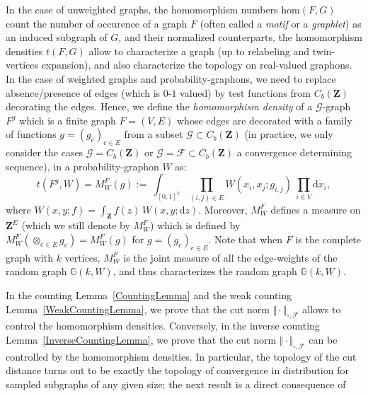 \documentclass{amsart}
\theoremstyle{plain}
\theoremstyle{definition}
\newcommand{\Space}{\mathbf{Z}}
\newcommand{\cG}{\mathcal{G}}
\newcommand{\bbG}{\mathbb{G}}
\newcommand{\CbFunct}{C_b(\Space)}
\newcommand{\NcutFSymbol}{\Vert\cdot\Vert_{\square,\mathcal{F}}}
\newcommand{\F}{\mathcal{F}}
\newcommand{\drv}{\mathrm{d}}
\begin{document}
In   the   case  of   unweighted   graphs,   the  homomorphism   numbers
$\text{hom}(F,G)$ count  the number of  occurence of a graph  $F$ (often
called a  \emph{motif} or a  \emph{graphlet}) as an induced  subgraph of
$G$,  and  their  normalized counterparts,  the  homomorphism  densities
$t(F,G)$  allow   to  characterize  a   graph  (up  to   relabeling  and
twin-vertices  expansion),   and  also  characterize  the   topology  on
real-valued   graphons.    In   the   case  of   weighted   graphs   and
probability-graphons,  we  need  to replace  absence/presence  of  edges
(which is $0$-$1$  valued) by test functions  from $\CbFunct$ decorating
the   edges.     Hence,   we  define   the
\emph{homomorphism density}  of a  $\cG$-graph $F^g$  which is  a finite
graph $F=(V,E)$  whose edges  are decorated with  a family  of functions
$g=(g_e)_{e\in E}$ from a subset $\cG \subset \CbFunct$ (in practice, we
only consider the cases $\cG =  \CbFunct$ or $\cG = \F \subset \CbFunct$
a convergence determining sequence), in a probability-graphon $W$ as:
\begin{equation*}
t(F^g,W) = M_W^F(g) 
:= \ \int_{[0,1]^{V}}  \prod_{(i,j)\in E} W(x_i,x_j; g_{i,j})		\	\prod_{i\in V} \drv x_i	 ,
\end{equation*}
where  $W(x,y;f) = \int_{\Space} f(z)\, W(x,y;\drv z)$.
Moreover, $M_W^F$ defines a measure on $\Space^E$
(which we still denote by $M_W^F$) which is defined by
$M_W^F(\otimes_{e\in E} g_e) = M_W^F(g)$
	for $g = (g_e)_{e\in E}$.
Note that when $F$ is the complete graph with $k$ vertices,
	$M_W^F$ is the joint measure of all the edge-weights of the random graph $\bbG(k,W)$,
	and thus characterizes the random graph $\bbG(k,W)$.

In the counting Lemma~\ref{CountingLemma} and the weak counting Lemma~\ref{WeakCountingLemma},
	we prove that the cut norm $\NcutFSymbol$ allows to control the homomorphism densities.
Conversely, in the inverse counting Lemma~\ref{InverseCountingLemma},
	we prove that the cut norm  $\NcutFSymbol$ can be controlled by the homomorphism densities.
        In particular, the topology of the  cut distance turns out to be
        exactly the topology of  convergence in distribution for sampled
        subgraphs  of any  given  size;  the next  result  is a direct
        consequence of
        
\end{document}
